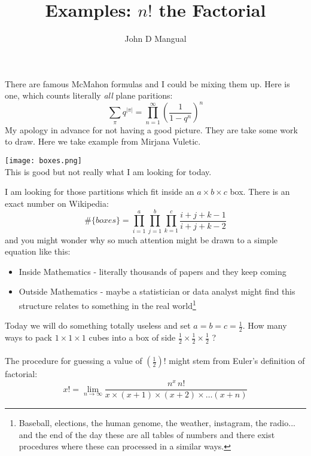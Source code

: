\documentclass[12pt]{article}
\title{\textbf{ Examples: $n!$ the Factorial}}
\author{John D Mangual}
\date{}
\begin{document}
\selectfont \fontsize{25}{30}\selectfont

\maketitle

\noindent There are famous McMahon formulas and I could be mixing them up.  Here is one, which counts literally \textit{all} plane paritions:
$$ \sum_{\pi} q^{|\pi|} = \prod_{n=1}^\infty \left( \frac{1}{1-q^n} \right)^n$$
My apology in advance for not having a good picture.  They are take some work to draw.  Here we take example from Mirjana Vuletic.

\texttt{[image: boxes.png]} \\
This is good but not really what I am looking for today.

\newpage

\noindent I am looking for those partitions which fit inside an $a \times b \times c$ box.  There is an exact number on Wikipedia:
$$ \# \{ boxes\} = \prod_{i=1}^a 
\prod_{j=1}^b
\prod_{k=1}^c \frac{i+j+k-1}{i+j+k-2}$$
and you might wonder why so much attention might be drawn to a simple equation like this:
\begin{itemize}
\item Inside Mathematics - literally thousands of papers and they keep coming
\item Outside Mathematics - maybe a statistician or data analyst might find this structure relates to something in the real world\footnote{Baseball, elections, the human genome, the weather, instagram, the radio... and the end of the day these are all tables of numbers and there exist procedures where these can processed in a similar ways.}
\end{itemize}
Today we will do something totally useless and set $a = b = c = \frac{1}{2}$.  How many ways to pack $1 \times 1 \times 1$ cubes into a box of side $\frac{1}{2}\times \frac{1}{2} \times \frac{1}{2}$ ? \\ \\
The procedure for guessing a value of $(\frac{1}{2})!$ might stem from Euler's definition of factorial:
$$ x! = \lim_{n \to \infty} \frac{n^x \, n!}{x \times (x+1)\times (x+2)\times \dots (x+n)} $$

\newpage
\end{document}
